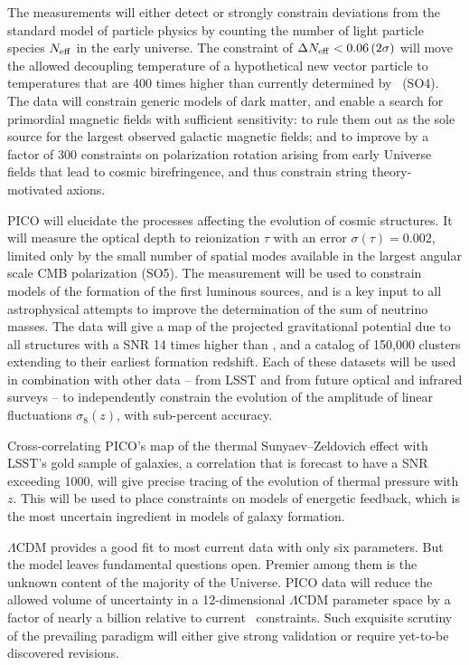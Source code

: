 \documentclass[PICOReport.tex]{subfiles}
\begin{document}
The measurements will either detect or strongly constrain deviations from the standard model of particle physics by counting the number of light particle species $N_{\rm eff}$ in the early universe.  The constraint of $\Delta N_{\rm eff} < 0.06 \, (2\sigma)$ will move the allowed decoupling temperature of a hypothetical new vector particle to temperatures that are 400 times higher than currently determined by \planck\ (SO4). The data will constrain generic models of dark matter, and enable a search for primordial magnetic fields with sufficient sensitivity: to rule them out as the sole source for the largest observed galactic magnetic fields; and to improve by a factor of 300 constraints on polarization rotation arising from early Universe fields that lead to cosmic birefringence, and thus constrain string theory-motivated axions. 

PICO will elucidate the processes affecting the evolution of cosmic structures. It will measure the optical depth to reionization $\tau$ with an error $\sigma(\tau) = 0.002$, limited only by the small number of spatial modes available in the largest angular scale CMB polarization (SO5). The measurement will be used to constrain models of the formation of the first luminous sources, and is a key input to all astrophysical attempts to improve the determination of the sum of neutrino masses. The data will give a map of the projected gravitational potential due to all structures with a \ac{SNR} 14 times higher than \planck , and a catalog of 150,000 clusters extending to their earliest formation redshift. Each of these datasets will be used in combination with other data -- from LSST and from future optical and infrared surveys -- to independently constrain the evolution of the amplitude of linear fluctuations $\sigma_{8}(z)$, with sub-percent accuracy.  

Cross-correlating PICO's map of the thermal Sunyaev--Zeldovich effect with LSST's gold sample of galaxies, a correlation that is forecast to have a \ac{SNR} exceeding 1000, will give precise tracing of the evolution of thermal pressure with $z$. This will be used to place constraints on models of energetic feedback, which is the most uncertain ingredient in models of galaxy formation. 


$\Lambda$CDM provides a good fit to most current data with only six parameters. But the model leaves fundamental questions open. Premier among them is the unknown content of the majority of the Universe. PICO data will reduce the allowed volume of uncertainty in a 12-dimensional $ \Lambda$CDM parameter space by a factor of nearly a billion relative to current \planck\ constraints. Such exquisite scrutiny of the prevailing paradigm will either give strong validation or require yet-to-be discovered revisions.
\end{document}
